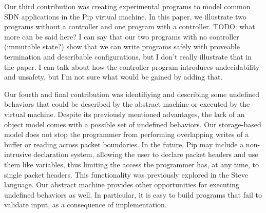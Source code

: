 Our third contribution was creating experimental programs to model common SDN applications in the Pip virtual machine. In this paper, we illustrate two programs without a controller and one program with a controller. TODO: what more can be said here? I can say that our two programs with no controller (immutable state?) show that we can write programs safely with proveable termination and describable configurations, but I don't really illustrate that in the paper. I can talk about how the controller program introduces undecidability and unsafety, but I'm not sure what would be gained by adding that. 

Our fourth and final contribution was identifiying and describing some undefined behaviors that could be described by the abstract machine or executed by the virtual machine. Despite its previously mentioned advantages, the lack of an object model comes with a possible set of undefined behaviors. Our storage-based model does not stop the programmer from performing overlapping writes of a buffer or reading across packet boundaries. In the future, Pip may include a non-intrusive declaration system, allowing the user to declare packet headers and use them like variables, thus limiting the access the programmer has, at any time, to single packet headers. This functionality was previously explored in the Steve language. Our abstract machine provides other opportunities for executing undefined behaviors as well. In particular, it is easy to build programs that fail to validate input, as a consequence of implementation.








